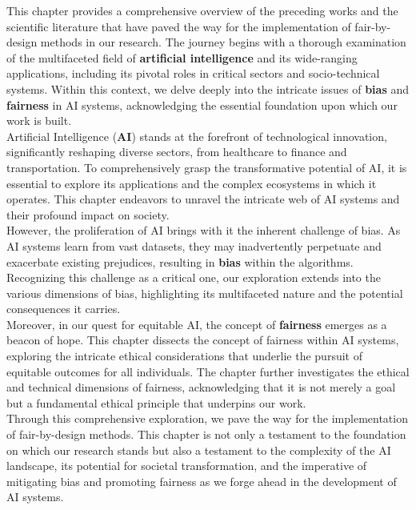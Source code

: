 \documentclass[12pt,a4paper,openright,twoside]{book}
\begin{document}
This chapter provides a comprehensive overview of the preceding works and the scientific literature that have paved the way for the implementation of fair-by-design methods in our research. The journey begins with a thorough examination of the multifaceted field of \textbf{artificial intelligence} and its wide-ranging applications, including its pivotal roles in critical sectors and socio-technical systems. Within this context, we delve deeply into the intricate issues of \textbf{bias} and \textbf{fairness} in AI systems, acknowledging the essential foundation upon which our work is built. \\
Artificial Intelligence (\textbf{AI}) stands at the forefront of technological innovation, significantly reshaping diverse sectors, from healthcare to finance and transportation. To comprehensively grasp the transformative potential of AI, it is essential to explore its applications and the complex ecosystems in which it operates. This chapter endeavors to unravel the intricate web of AI systems and their profound impact on society. \\
However, the proliferation of AI brings with it the inherent challenge of bias. As AI systems learn from vast datasets, they may inadvertently perpetuate and exacerbate existing prejudices, resulting in \textbf{bias} within the algorithms. Recognizing this challenge as a critical one, our exploration extends into the various dimensions of bias, highlighting its multifaceted nature and the potential consequences it carries. \\
Moreover, in our quest for equitable AI, the concept of \textbf{fairness} emerges as a beacon of hope. This chapter dissects the concept of fairness within AI systems, exploring the intricate ethical considerations that underlie the pursuit of equitable outcomes for all individuals. The chapter further investigates the ethical and technical dimensions of fairness, acknowledging that it is not merely a goal but a fundamental ethical principle that underpins our work. \\
Through this comprehensive exploration, we pave the way for the implementation of fair-by-design methods. This chapter is not only a testament to the foundation on which our research stands but also a testament to the complexity of the AI landscape, its potential for societal transformation, and the imperative of mitigating bias and promoting fairness as we forge ahead in the development of AI systems. \\
\end{document}
